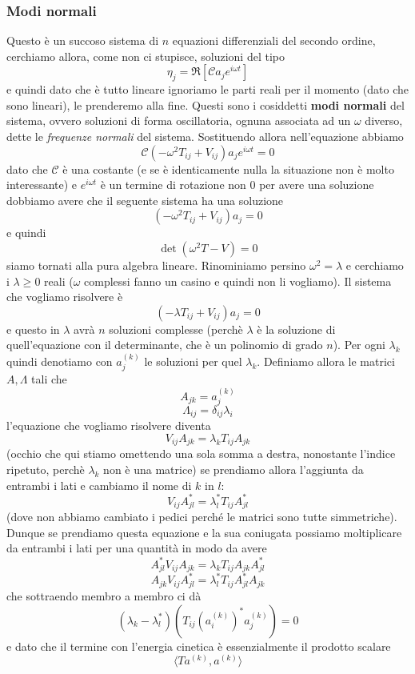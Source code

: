 \documentclass[11pt]{scrartcl}
\begin{document}
	\subsubsection{Modi normali}
	Questo è un succoso sistema di $n$ equazioni differenziali del secondo ordine, cerchiamo allora, come non ci stupisce, soluzioni del tipo
	$$\eta_j=\Re\left[\mathcal{C}a_j e^{i\omega t}\right]$$ 
	e quindi dato che è tutto lineare ignoriamo le parti reali per il momento (dato che sono lineari), le prenderemo alla fine. Questi sono i cosiddetti \textbf{modi normali} del sistema, ovvero soluzioni di forma oscillatoria, ognuna associata ad un $\omega$ diverso, dette le \textit{frequenze normali} del sistema. Sostituendo allora nell'equazione abbiamo
	$$\mathcal{C}\left(-\omega^2 T_{ij}+V_{ij}\right)a_je^{i\omega t}=0$$
	dato che $\mathcal{C}$ è una costante (e se è identicamente nulla la situazione non è molto interessante) e $e^{i\omega t}$ è un termine di rotazione non $0$ per avere una soluzione dobbiamo avere che il seguente sistema ha una soluzione
	$$\left(-\omega^2T_{ij}+V_{ij}\right)a_j=0$$
	e quindi 
	$$\det\left(\omega^2T-V\right)=0$$
	siamo tornati alla pura algebra lineare. Rinominiamo persino $\omega^2=\lambda$ e cerchiamo i $\lambda\ge 0$ reali ($\omega$ complessi fanno un casino e quindi non li vogliamo). Il sistema che vogliamo risolvere è
	$$\left(-\lambda T_{ij}+V_{ij}\right)a_j=0$$
	e questo in $\lambda$ avrà $n$ soluzioni complesse (perchè $\lambda$ è la soluzione di quell'equazione con il determinante, che è un polinomio di grado $n$). Per ogni $\lambda_k$ quindi denotiamo con $a_j^{(k)}$ le soluzioni per quel $\lambda_k$. Definiamo allora le matrici $A,\Lambda$ tali che
	$$A_{jk}=a_j^{(k)}$$
	$$\Lambda_{ij}=\delta_{ij}\lambda_i$$
	l'equazione che vogliamo risolvere diventa
	$$V_{ij}A_{jk}=\lambda_kT_{ij}A_{jk}$$
	(occhio che qui stiamo omettendo una sola somma a destra, nonostante l'indice ripetuto, perchè $\lambda_k$ non è una matrice) se prendiamo allora l'aggiunta da entrambi i lati e cambiamo il nome di $k$ in $l$:
	$$V_{ij}A_{jl}^*=\lambda_l^*T_{ij}A_{jl}^*$$
	(dove non abbiamo cambiato i pedici perché le matrici sono tutte simmetriche).
	Dunque se prendiamo questa equazione e la sua coniugata possiamo moltiplicare da entrambi i lati per una quantità in modo da avere
	$$A_{jl}^*V_{ij}A_{jk}=\lambda_kT_{ij}A_{jk}A_{jl}^*$$
	$$A_{jk}V_{ij}A_{jl}^*=\lambda_l^*T_{ij}A_{jl}^*A_{jk}$$
	che sottraendo membro a membro ci dà
	$$\left(\lambda_k-\lambda_l^*\right)\left(T_{ij}\left(a_i^{(k)}\right)^*a_j^{(k)}\right)=0$$
	e dato che il termine con l'energia cinetica è essenzialmente il prodotto scalare $$\langle Ta^{(k)},a^{(k)} \rangle$$
\end{document}
